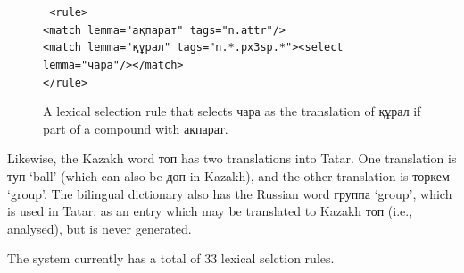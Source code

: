 \documentclass[11pt]{article}
\newcommand{\eng}[1]{`#1'}
\begin{document}
\begin{figure}[htbp]
\hspace{3cm}\parbox[t]{0.7\textwidth}{{\tt
  <rule> \\
    <match lemma="ақпарат" tags="n.attr"/> \\
    <match lemma="құрал" tags="n.*.px3sp.*"><select lemma="чара"/></match> \\
  </rule>
}}%
\caption{A lexical selection rule that selects чара as the translation of құрал if part of a compound with ақпарат.}
\label{fig:lrx}
\end{figure}

Likewise, the Kazakh word топ has two translations into Tatar.  One translation is туп \eng{ball} (which can also be доп in Kazakh), and the other translation is төркем \eng{group}.  The bilingual dictionary also has the Russian word группа \eng{group}, which is used in Tatar, as an entry which may be translated to Kazakh топ (i.e., analysed), but is never generated.

The system currently has a total of 33 lexical selction rules.

\end{document}
